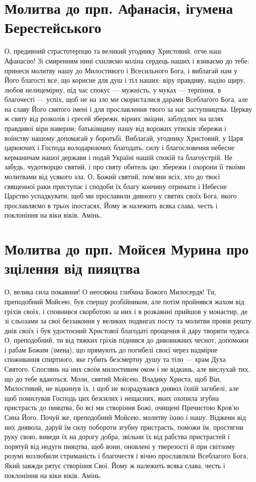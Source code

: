\documentclass[chapters.tex]{subfiles}
\begin{document}
\section{Молитва до прп. Афанасія, ігумена Берестейського}
О, предивний страстотерпцю та великий угоднику Христовий, отче наш Афанасію! Зі смиренням нині схиляємо коліна сердець наших і взиваємо до тебе: принеси молитву нашу до Милостивого і Всесильного Бога, і виблагай нам у Його благості все, що корисне для душ і тіл наших: віру правдиву, надію щиру, любов нелицемірну, під час спокус — мужність, у муках — терпіння, в благочесті — успіх, щоб не на зло ми скористалися дарами Всеблагого Бога, але на славу Його святого імені і для прославлення твого за нас заступництва. Церкву ж святу від розколів і єресей збережи, вірних зміцни, заблудлих на шлях правдивої віри наверни; батьківщину нашу від ворожих утисків збережи і воїнству нашому допомагай у боротьбі. Виблагай, угоднику Христовий, у Царя царюючих і Господа володарюючих благодать, силу і благословення небесне керманичам нашої держави і подай Україні нашій спокій та благоустрій. Не забудь, чудотворцю святий, і про святу обитель цю: збережи і охорони її твоїми молитвами від усякого зла. О, Божий святий, пом’яни всіх, хто до твоєї священної раки приступає і сподоби їх благу кончину отримати і Небесне Царство успадкувати, щоб ми прославили дивного у святих своїх Бога, якого прославляємо в трьох іпостасях, Йому ж належить всяка слава, честь і поклоніння на віки віків. Амінь.

\section{Молитва до прп. Мойсея Мурина про зцілення від пияцтва}
О, велика сила покаяння! О неосяжна глибина Божого Милосердя! Ти, преподобний Мойсею, був спершу розбійником, але потім пройнявся жахом від гріхів своїх, і сповнився скорботою за них і в розкаянні прийшов у монастир, де зі сльозами за свої беззаконня у великих подвигах посту та молитви провів решту днів своїх і був удостоєний Христової благодаті прощення й дару творити чудеса. О, преподобний, ти від тяжких гріхів піднявся до дивовижних чеснот, допоможи і рабам Божим (імена), що прямують до погибелі своєї через надмірне споживання спиртного, яке губить безсмертну душу та тіло — храм Духа Святого. Споглянь на них своїм милостивим оком і не відкинь, але вислухай тих, що до тебе вдаються. Моли, святий Мойсею, Владику Христа, щоб Він, Милостивий, не відкинув їх, і щоб не возрадувався диявол їхній загибелі, але щоб помилував Господь цих безсилих і нещасних, яких охопила згубна пристрасть до пияцтва, бо всі ми створіння Божі, очищені Пречистою Кров’ю Сина Його. Почуй же, преподобний Мойсею, молитву їхню і нашу. Віджени від них диявола, даруй їм силу побороти згубну пристрасть, поможи їм, простягни руку свою, виведи їх на дорогу добра, звільни їх від рабства пристрастей і порятуй від недуги пияцтва, щоб вони, оновлені у тверезості й при світлому розумі возлюбили стриманість і благочестя і вічно прославляли Всеблагого Бога, Який завжди рятує створіння Свої. Йому ж належить всяка слава, честь і поклоніння на віки віків. Амінь.
\end{document}
